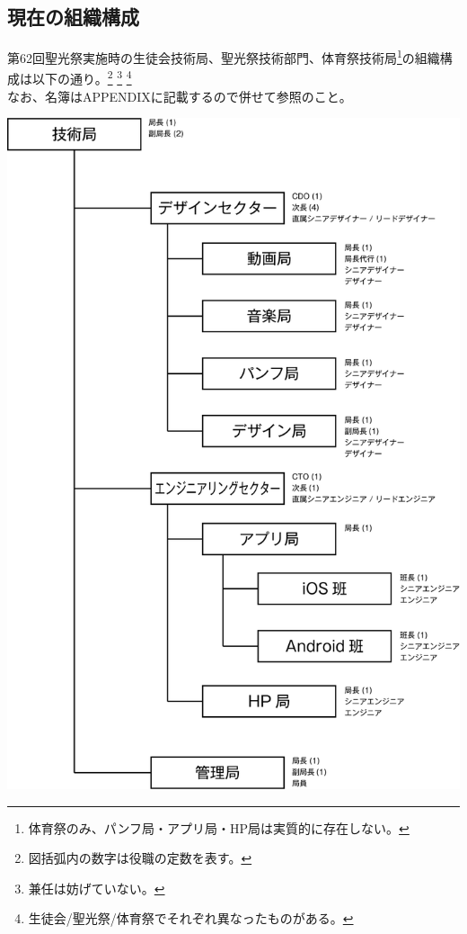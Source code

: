 \documentclass[dvipdfmx,jb5]{jreport}
\begin{document}
\subsection{現在の組織構成}
第62回聖光祭実施時の生徒会技術局、聖光祭技術部門、体育祭技術局\footnote{体育祭のみ、パンフ局・アプリ局・HP局は実質的に存在しない。}の組織構成は以下の通り。\footnote{図括弧内の数字は役職の定数を表す。} \footnote{兼任は妨げていない。} \footnote{生徒会/聖光祭/体育祭でそれぞれ異なったものがある。}\\
なお、名簿はAPPENDIXに記載するので併せて参照のこと。


\vspace{5mm}
\includegraphics[scale=0.7]{assets/tech.png}\\
\end{document}
